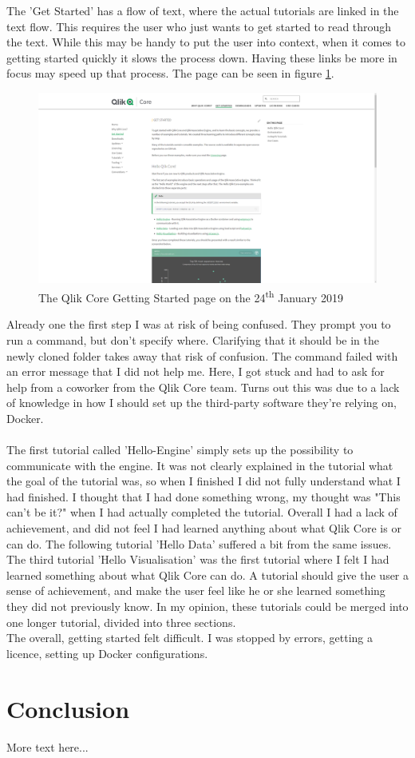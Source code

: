\documentclass{article}
\begin{document}
The 'Get Started' has a flow of text, where the actual tutorials are linked in the text flow. This requires the user who just wants to get started to read through the text. While this may be handy to put the user into context, when it comes to getting started quickly it slows the process down. Having these links be more in focus may speed up that process. The page can be seen in figure \ref{fig:gettingstarted}.
\begin{figure}[H]
    \centering
    \includegraphics[width=\linewidth]{qlikCoreWebsite-GetStarted20190124.png}
    \caption{The Qlik Core Getting Started page on the 24\textsuperscript{th} January 2019}
    \label{fig:gettingstarted}
\end{figure}
Already one the first step I was at risk of being confused. They prompt you to run a command, but don't specify where. Clarifying that it should be in the newly cloned folder takes away that risk of confusion. The command failed with an error message that I did not help me. Here, I got stuck and had to ask for help from a coworker from the Qlik Core team. Turns out this was due to a lack of knowledge in how I should set up the third-party software they're relying on, Docker.\\ \\
The first tutorial called 'Hello-Engine' simply sets up the possibility to communicate with the engine. It was not clearly explained in the tutorial what the goal of the tutorial was, so when I finished I did not fully understand what I had finished. I thought that I had done something wrong, my thought was "This can't be it?" when I had actually completed the tutorial. Overall I had a lack of achievement, and did not feel I had learned anything about what Qlik Core is or can do. The following tutorial 'Hello Data' suffered a bit from the same issues. The third tutorial 'Hello Visualisation' was the first tutorial where I felt I had learned something about what Qlik Core can do. A tutorial should give the user a sense of achievement, and make the user feel like he or she learned something they did not previously know. In my opinion, these tutorials could be merged into one longer tutorial, divided into three sections. \\


The overall, getting started felt difficult. I was stopped by errors, getting a licence, setting up Docker configurations.
\section{Conclusion}
More text here...
\newpage


\end{document}
